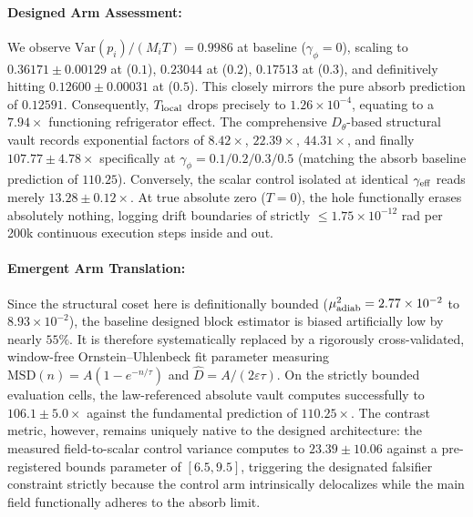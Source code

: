 \documentclass{article}
\begin{document}
\paragraph{Designed Arm Assessment:} We observe $\mathrm{Var}(p_i)/(M_iT)=0.9986$ at baseline ($\gamma_\phi=0$), scaling to $0.36171\pm0.00129$ at ($0.1$), $0.23044$ at ($0.2$), $0.17513$ at ($0.3$), and definitively hitting $0.12600\pm0.00031$ at ($0.5$). This closely mirrors the pure absorb prediction of $0.12591$. Consequently, $T_{\rm local}$ drops precisely to $1.26\times10^{-4}$, equating to a $7.94\times$ functioning refrigerator effect. The comprehensive $D_\theta$-based structural vault records exponential factors of $8.42\times$, $22.39\times$, $44.31\times$, and finally $107.77\pm4.78\times$ specifically at $\gamma_\phi=0.1/0.2/0.3/0.5$ (matching the absorb baseline prediction of $110.25$). Conversely, the scalar control isolated at identical $\gamma_{\rm eff}$ reads merely $13.28\pm0.12\times$. At true absolute zero ($T=0$), the hole functionally erases absolutely nothing, logging drift boundaries of strictly $\le1.75\times10^{-12}$ rad per 200k continuous execution steps inside and out.

\paragraph{Emergent Arm Translation:} Since the structural coset here is definitionally bounded ($\mu^2_{\rm adiab}=2.77\times10^{-2}$ to $8.93\times10^{-2}$), the baseline designed block estimator is biased artificially low by nearly $55\%$. It is therefore systematically replaced by a rigorously cross-validated, window-free Ornstein--Uhlenbeck fit parameter measuring $\mathrm{MSD}(n)=A(1-e^{-n/\tau})$ and $\hat D=A/(2\varepsilon\tau)$. On the strictly bounded evaluation cells, the law-referenced absolute vault computes successfully to $106.1\pm5.0\times$ against the fundamental prediction of $110.25\times$. The contrast metric, however, remains uniquely native to the designed architecture: the measured field-to-scalar control variance computes to $23.39\pm10.06$ against a pre-registered bounds parameter of $[6.5,9.5]$, triggering the designated falsifier constraint strictly because the control arm intrinsically delocalizes while the main field functionally adheres to the absorb limit.
\end{document}
